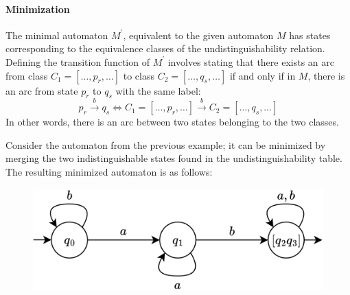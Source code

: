\paragraph*{Minimization}
The minimal automaton $M^{\prime}$, equivalent to the given automaton $M$ has states corresponding to the equivalence classes of the undistinguishability relation.
Defining the transition function of  $M^{\prime}$ involves stating that there exists an arc from class $C_1=[\dots,p_r,\dots]$ to class $C_2=[\dots,q_s,\dots]$ if and only if in $M$, there is an arc from state $p_r$ to $q_s$ with the same label:
\[p_r \overset{b}{\rightarrow}q_s \Leftrightarrow C_1=[\dots,p_r,\dots] \overset{b}{\rightarrow} C_2=[\dots,q_s,\dots]\]
In other words, there is an arc between two states belonging to the two classes.
\begin{example}
    Consider the automaton from the previous example; it can be minimized by merging the two indistinguishable states found in the undistinguishability table.
    The resulting minimized automaton is as follows:
    \begin{figure}[H]
        \centering
        \includegraphics[width=0.6\linewidth]{images/fsamin1.png}
    \end{figure}
\end{example}